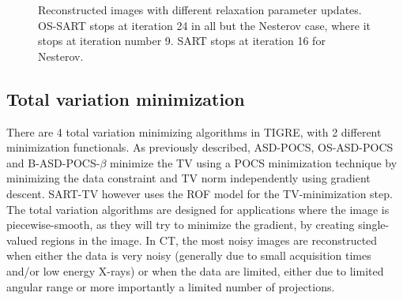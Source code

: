 \begin{figure}
\centering
{}
\caption[Reconstructed images with different relaxation parameter updates]{\label{fig:SARTlambdaplot}Reconstructed images with different relaxation parameter updates. OS-SART stops at iteration 24 in all but the Nesterov case, where it stops at iteration number 9. SART stops at iteration 16 for Nesterov.}
\end{figure}



\subsection{Total variation minimization}
There are 4 total variation minimizing algorithms in TIGRE, with 2 different minimization functionals. As previously described, ASD-POCS, OS-ASD-POCS and B-ASD-POCS-$\beta$ minimize the TV using a POCS minimization technique by minimizing the data constraint and TV norm independently using gradient descent. SART-TV however uses the ROF model for the TV-minimization step. The total variation algorithms are designed for applications where the image is piecewise-smooth, as they will try to minimize the gradient, by creating single-valued regions in the image. In CT, the most noisy images are reconstructed when either the data is very noisy (generally due to small acquisition times and/or low energy X-rays) or when the data are limited, either due to limited angular range or more importantly a limited number of projections. 

